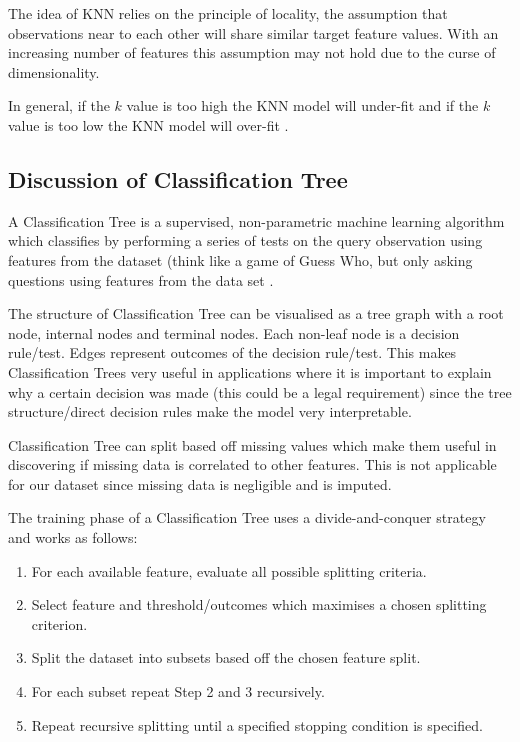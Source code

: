 \documentclass[conference]{IEEEtran}
\begin{document}
The idea of KNN relies on the principle of locality, the assumption that observations near to each other will share similar target feature values. With an increasing number of features this assumption may not hold due to the curse of dimensionality.
 
In general, if the $k$ value is too high the KNN model will under-fit and if the $k$ value is too low the KNN model will over-fit \cite[p.~193]{fundamentals}.

\subsection{Discussion of Classification Tree}

A Classification Tree is a supervised, non-parametric machine learning algorithm which classifies by performing a series of tests on the query observation using features from the dataset (think like a game of Guess Who, but only asking questions using features from the data set \cite[p.~121]{fundamentals}.

The structure of Classification Tree can be visualised as a tree graph with a root node, internal nodes and terminal nodes. Each non-leaf node is a decision rule/test. Edges represent outcomes of the decision rule/test. This makes Classification Trees very useful in applications where it is important to explain why a certain decision was made (this could be a legal requirement) since the tree structure/direct decision rules make the model very interpretable.

Classification Tree can split based off missing values which make them useful in discovering if missing data is correlated to other features. This is not applicable for our dataset since missing data is negligible and is imputed.

The training phase of a Classification Tree uses a divide-and-conquer strategy and works as follows:

\begin{enumerate}
	\item For each available feature, evaluate all possible splitting criteria.
	\item Select feature and threshold/outcomes which maximises a chosen splitting criterion.
	\item Split the dataset into subsets based off the chosen feature split.
	\item For each subset repeat Step 2 and 3 recursively.
	\item Repeat recursive splitting until a specified stopping condition is specified.
\end{enumerate}
\end{document}
